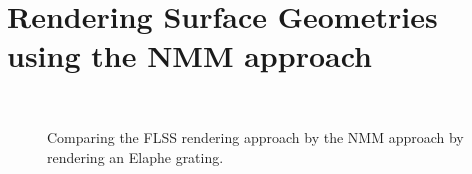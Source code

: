 \chapter{Rendering Surface Geometries using the NMM approach}
\label{chap:diffflssnmm}

\begin{figure}[H]
  \centering
~
~
\caption[Comparing NMM Approach with FLSS Approach]{Comparing the FLSS rendering approach by the NMM approach by rendering an Elaphe grating.}
\label{fig:appendixflssvsnmm}
\end{figure}

